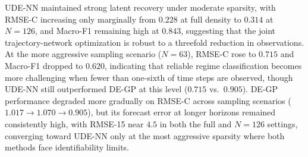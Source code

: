 \documentclass[openacc]{rsproca_new}%
\begin{document}
UDE-NN maintained strong latent recovery under moderate sparsity, with RMSE-C increasing only marginally from $0.228$ at full density to $0.314$ at $N=126$, and Macro-F1 remaining high at $0.843$, suggesting that the joint trajectory-network optimization is robust to a threefold reduction in observations. At the more aggressive sampling scenario ($N=63$), RMSE-C rose to $0.715$ and Macro-F1 dropped to $0.620$, indicating that reliable regime classification becomes more challenging when fewer than one-sixth of time steps are observed, though UDE-NN still outperformed DE-GP at this level ($0.715$ vs.\ $0.905$). DE-GP performance degraded more gradually on RMSE-C across sampling scenarios ($1.017 \to 1.070 \to 0.905$), but its forecast error at longer horizons remained consistently high, with RMSE-15 near $4.5$ in both the full and $N=126$ settings, converging toward UDE-NN only at the most aggressive sparsity where both methods face identifiability limits. 
% 
\end{document}
